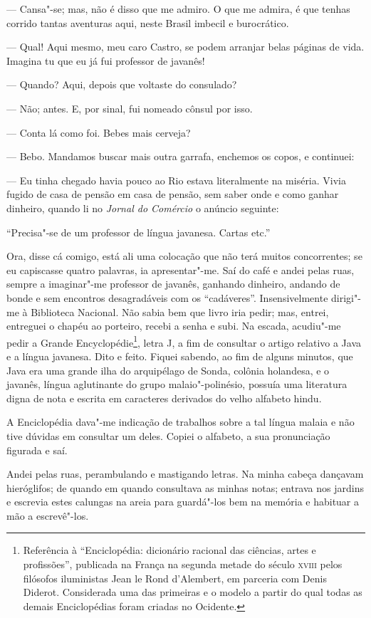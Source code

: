 --- Cansa"-se; mas, não é disso que me admiro. O que me admira, é que
tenhas corrido tantas aventuras aqui, neste Brasil imbecil e
burocrático.

--- Qual! Aqui mesmo, meu caro Castro, se podem arranjar belas páginas
de vida. Imagina tu que eu já fui professor de javanês!

--- Quando? Aqui, depois que voltaste do consulado?

--- Não; antes. E, por sinal, fui nomeado cônsul por isso.

--- Conta lá como foi. Bebes mais cerveja?

--- Bebo. Mandamos buscar mais outra garrafa, enchemos os copos, e
continuei:

--- Eu tinha chegado havia pouco ao Rio estava literalmente na miséria.
Vivia fugido de casa de pensão em casa de pensão, sem saber onde e como
ganhar dinheiro, quando li no \emph{Jornal do Comércio} o anúncio
seguinte:

``Precisa"-se de um professor de língua javanesa. Cartas etc.''

Ora, disse cá comigo, está ali uma colocação que não terá muitos
concorrentes; se eu capiscasse quatro palavras, ia apresentar"-me. Saí do
café e andei pelas ruas, sempre a imaginar"-me professor de javanês,
ganhando dinheiro, andando de bonde e sem encontros desagradáveis com os
``cadáveres''. Insensivelmente dirigi"-me à Biblioteca Nacional. Não
sabia bem que livro iria pedir; mas, entrei, entreguei o chapéu ao
porteiro, recebi a senha e subi. Na escada, acudiu"-me pedir a Grande
Encyclopédie\footnote{Referência à ``Enciclopédia: dicionário racional
  das ciências, artes e profissões'', publicada na França na segunda
  metade do século \textsc{xviii} pelos filósofos iluministas Jean le Rond
  d'Alembert, em parceria com Denis Diderot. Considerada uma das
  primeiras e o modelo a partir do qual todas as demais Enciclopédias
  foram criadas no Ocidente.}, letra J, a fim de consultar o artigo
relativo a Java e a língua javanesa. Dito e feito. Fiquei sabendo, ao
fim de alguns minutos, que Java era uma grande ilha do arquipélago de
Sonda, colônia holandesa, e o javanês, língua aglutinante do grupo
malaio"-polinésio, possuía uma literatura digna de nota e escrita em
caracteres derivados do velho alfabeto hindu.

A Enciclopédia dava"-me indicação de trabalhos sobre a tal língua malaia
e não tive dúvidas em consultar um deles. Copiei o alfabeto, a sua
pronunciação figurada e saí.

Andei pelas ruas, perambulando e mastigando letras. Na minha cabeça
dançavam hieróglifos; de quando em quando consultava as minhas notas;
entrava nos jardins e escrevia estes calungas na areia para guardá"-los
bem na memória e habituar a mão a escrevê"-los.

